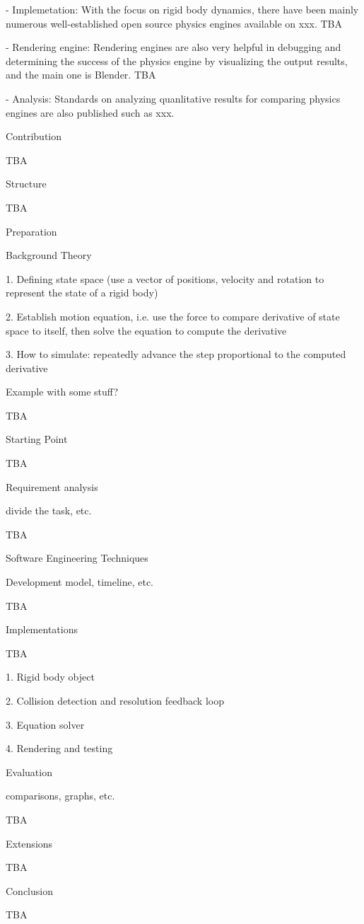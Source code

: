 

- Implemetation:
With the focus on rigid body dynamics, there have been mainly numerous well-established open source physics engines available on xxx. TBA

- Rendering engine:
Rendering engines are also very helpful in debugging and determining the success of the physics engine by visualizing the output results, and the main one is Blender. TBA

- Analysis:
Standards on analyzing quanlitative results for comparing physics engines are also published such as xxx.

Contribution

TBA

Structure

TBA

Preparation

Background Theory

1. Defining state space (use a vector of positions, velocity and rotation to represent the state of a rigid body)

2. Establish motion equation, i.e. use the force to compare derivative of state space to itself, then solve the equation to compute the derivative

3. How to simulate: repeatedly advance the step proportional to the computed derivative

Example with some stuff?

TBA

Starting Point

TBA

Requirement analysis

divide the task, etc.

TBA

Software Engineering Techniques

Development model, timeline, etc.

TBA

Implementations

TBA

1. Rigid body object

2. Collision detection and resolution feedback loop

3. Equation solver

4. Rendering and testing

Evaluation

comparisons, graphs, etc.

TBA

Extensions

TBA

Conclusion

TBA
